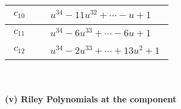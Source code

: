 \documentclass[1p]{elsarticle_modified}
\theoremstyle{definition}
\begin{document}
\begin{tabular}{m{50pt}|m{274pt}}
\hline $$\begin{aligned}c_{10}\end{aligned}$$&$\begin{aligned}
&u^{34}-11 u^{32}+\cdots- u+1
\end{aligned}$\\
\hline $$\begin{aligned}c_{11}\end{aligned}$$&$\begin{aligned}
&u^{34}-6 u^{33}+\cdots-6 u+1
\end{aligned}$\\
\hline $$\begin{aligned}c_{12}\end{aligned}$$&$\begin{aligned}
&u^{34}-2 u^{33}+\cdots+13 u^2+1
\end{aligned}$\\
\hline
\end{tabular}\\~\\
\newpage\renewcommand{\arraystretch}{1}
\flushleft \textbf{(v) Riley Polynomials at the component}\newline \\
\end{document}

